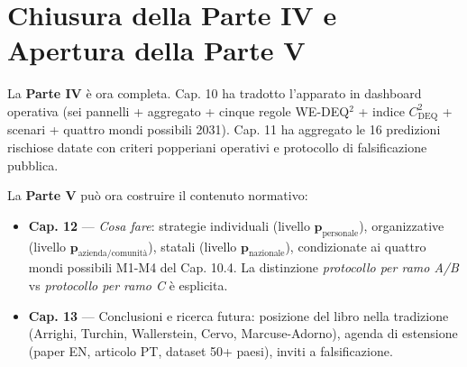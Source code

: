\section{Chiusura della Parte IV e Apertura della Parte
V}\label{chiusura-della-parte-iv-e-apertura-della-parte-v}

La \textbf{Parte IV} è ora completa. Cap. 10 ha tradotto l'apparato in
dashboard operativa (sei pannelli + aggregato + cinque regole WE-DEQ$^2$ +
indice \(C_{\text{DEQ}}^2\) + scenari + quattro mondi possibili 2031).
Cap. 11 ha aggregato le 16 predizioni rischiose datate con criteri
popperiani operativi e protocollo di falsificazione pubblica.

La \textbf{Parte V} può ora costruire il contenuto normativo:

\begin{itemize}
\tightlist
\item
  \textbf{Cap. 12} --- \emph{Cosa fare}: strategie individuali (livello
  \(\boldsymbol{p}_{\text{personale}}\)), organizzative (livello
  \(\boldsymbol{p}_{\text{azienda/comunità}}\)), statali (livello
  \(\boldsymbol{p}_{\text{nazionale}}\)), condizionate ai quattro mondi
  possibili M1-M4 del Cap. 10.4. La distinzione \emph{protocollo per
  ramo A/B} vs \emph{protocollo per ramo C} è esplicita.
\item
  \textbf{Cap. 13} --- Conclusioni e ricerca futura: posizione del libro
  nella tradizione (Arrighi, Turchin, Wallerstein, Cervo,
  Marcuse-Adorno), agenda di estensione (paper EN, articolo PT, dataset
  50+ paesi), inviti a falsificazione.
\end{itemize}


